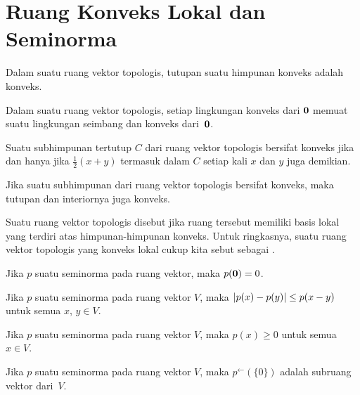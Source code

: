 \section{Ruang Konveks Lokal dan Seminorma}

\begin{prop} Dalam suatu ruang vektor topologis, tutupan suatu himpunan konveks adalah konveks.
\end{prop}

\begin{prop} Dalam suatu ruang vektor topologis, setiap lingkungan konveks dari $\mathbf{0}$ memuat suatu lingkungan seimbang dan konveks dari~$\mathbf{0}$.
\end{prop}

\begin{prop} Suatu subhimpunan tertutup $C$ dari ruang vektor topologis bersifat konveks jika dan hanya jika $\frac12(x + y)$ termasuk dalam $C$ setiap kali $x$ dan $y$ juga demikian.
\end{prop}

\begin{prop} Jika suatu subhimpunan dari ruang vektor topologis bersifat konveks, maka tutupan dan interiornya juga konveks.
\end{prop}

\begin{defn} Suatu ruang vektor topologis disebut
 jika ruang tersebut memiliki basis lokal yang terdiri atas himpunan-himpunan konveks. Untuk ringkasnya, suatu ruang vektor topologis
yang konveks lokal cukup kita sebut sebagai
.
\end{defn}

\begin{prop} Jika $p$ suatu seminorma pada ruang vektor, maka $p(\mathbf{0}) = 0$.
\end{prop}

\begin{prop} Jika $p$ suatu seminorma pada ruang vektor $V$, maka $\lvert p(x) - p(y)\rvert \le p(x - y)$ untuk semua $x$, $y \in V$.
\end{prop}

\begin{cor} Jika $p$ suatu seminorma pada ruang vektor $V$, maka $p(x) \ge 0$ untuk semua $x \in V$.
\end{cor}

\begin{prop} Jika $p$ suatu seminorma pada ruang vektor $V$, maka $p^{\gets}(\{0\})$ adalah subruang vektor dari~$V$.
\end{prop}

